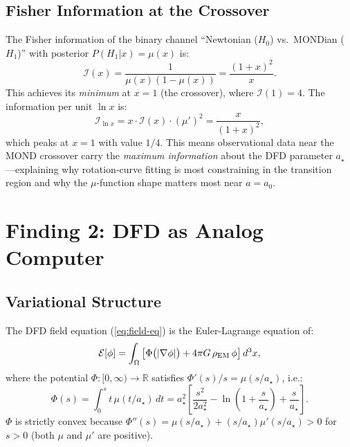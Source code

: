 \documentclass[11pt]{article}
\theoremstyle{definition}
\theoremstyle{remark}
\newcommand{\astar}{a_\star}
\begin{document}
\subsection{Fisher Information at the Crossover}

The Fisher information of the binary channel ``Newtonian ($H_0$) vs.\
MONDian ($H_1$)'' with posterior $P(H_1|x) = \mu(x)$ is:
\begin{equation}
  \mathcal{I}(x) = \frac{1}{\mu(x)(1-\mu(x))}
  = \frac{(1+x)^2}{x}.
  \label{eq:fisher}
\end{equation}
This achieves its \emph{minimum} at $x = 1$ (the crossover), where
$\mathcal{I}(1) = 4$. The information per unit $\ln x$ is:
\begin{equation}
  \mathcal{I}_{\ln x} = x \cdot \mathcal{I}(x) \cdot (\mu')^2
  = \frac{x}{(1+x)^2},
  \label{eq:fisher-log}
\end{equation}
which peaks at $x = 1$ with value $1/4$. This means observational
data near the MOND crossover carry the \emph{maximum information}
about the DFD parameter $\astar$---explaining why rotation-curve
fitting is most constraining in the transition region and why
the $\mu$-function shape matters most near $a = a_0$.


\section{Finding 2: DFD as Analog Computer}
\label{sec:analog}

\subsection{Variational Structure}

The DFD field equation (\ref{eq:field-eq}) is the Euler-Lagrange
equation of:
\begin{equation}
  \mathcal{E}[\phi] = \int_\Omega \left[
    \Phi\bigl(|\nabla\phi|\bigr) + 4\pi G\,\rho_{\rm EM}\,\phi
  \right] d^3x,
  \label{eq:energy}
\end{equation}
where the potential $\Phi: [0,\infty) \to \mathbb{R}$ satisfies
$\Phi'(s)/s = \mu(s/\astar)$, i.e.:
\begin{equation}
  \Phi(s) = \int_0^s t\,\mu(t/\astar)\,dt
  = \astar^2 \left[\frac{s^2}{2\astar^2}
    - \ln\left(1 + \frac{s}{\astar}\right) + \frac{s}{\astar}\right].
  \label{eq:Phi}
\end{equation}
$\Phi$ is strictly convex because $\Phi''(s) = \mu(s/\astar) +
(s/\astar)\mu'(s/\astar) > 0$ for $s > 0$ (both $\mu$ and $\mu'$ are
positive).
\end{document}
